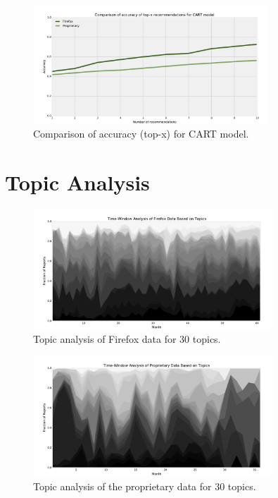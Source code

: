\documentclass[nopalatino,nolot,nolof,color]{fithesis3}
\begin{document}
 \begin{figure}[htbp]
    \centering
        \includegraphics[width=335px]{./images/top_x_comparison/cart_accuracy.pdf}
    \caption{Comparison of accuracy (top-x) for CART model.}
    \label{fig:results.topx.cart_accuracy}
 \end{figure}

 \clearpage
 \section{Topic Analysis}

 \begin{figure}[htbp]
    \centering
        \includegraphics[width=340px]{./images/topic_component_distribution/firefox_topic.pdf}
    \caption{Topic analysis of Firefox data for 30 topics.}
    \label{fig:distribution.firefox.topic.30}
 \end{figure}

 \begin{figure}[htbp]
    \centering
        \includegraphics[width=340px]{./images/topic_component_distribution/proprietary_topic.pdf}
    \caption{Topic analysis of the proprietary data for 30 topics.}
    \label{fig:distribution.prop.topic.30}
 \end{figure}
\end{document}

